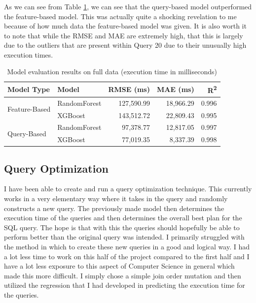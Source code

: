 \documentclass[sigconf]{acmart}
\begin{document}
As we can see from Table \ref{tab:model-evaluation}, we can see that the query-based model outperformed the feature-based model.
This was actually quite a shocking revelation to me because of how much data the feature-based model was given. It is also worth it to note that while the RMSE and MAE are extremely high, that this is largely due to the outliers
that are present within Query 20 due to their unusually high execution times.

\begin{table}[h!]
  \centering
  \begin{tabular}{|l|l|r|r|r|}
    \hline
    \textbf{Model Type} & \textbf{Model}  & \textbf{RMSE (ms)} & \textbf{MAE (ms)} & \textbf{R\textsuperscript{2}} \\
    \hline
    \multirow{2}{*}{Feature-Based} 
      & RandomForest & 127,590.99 & 18,966.29 & 0.996 \\
      & XGBoost      & 143,512.72 & 22,809.43 & 0.995 \\
    \hline
    \multirow{2}{*}{Query-Based} 
      & RandomForest & 97,378.77 & 12,817.05 & 0.997 \\
      & XGBoost      & 77,019.35 & 8,337.39  & 0.998 \\
    \hline
  \end{tabular}
  \caption{Model evaluation results on full data (execution time in milliseconds)}
  \label{tab:model-evaluation}
\end{table}

\subsection{Query Optimization}
I have been able to create and run a query optimization technique. This currently works in a very elementary way where it takes in the query and randomly constructs
a new query. The previously made model then determines the execution time of the queries and then determines the overall best plan for the SQL query. The hope is that with
this the queries should hopefully be able to perform better than the original query was intended. I primarily struggled with the method in which to create these new queries in
a good and logical way. I had a lot less time to work on this half of the project compared to the first half and I have a lot less exposure to this aspect of Computer Science in general
which made this more difficult. I simply chose a simple join order mutation and then utilized the regression that I had developed in predicting the execution time for the queries.
\end{document}
